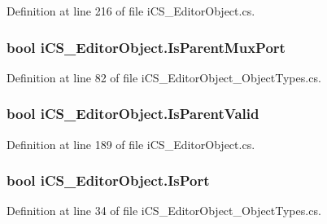 Definition at line 216 of file i\+C\+S\+\_\+\+Editor\+Object.\+cs.

\hypertarget{classi_c_s___editor_object_a9e197b013a5d84b3d804e6b41b49b457}{
\subsubsection[{Is\+Parent\+Mux\+Port}]{\setlength{\rightskip}{0pt plus 5cm}bool i\+C\+S\+\_\+\+Editor\+Object.\+Is\+Parent\+Mux\+Port\hspace{0.3cm}{\ttfamily [get]}}}\label{classi_c_s___editor_object_a9e197b013a5d84b3d804e6b41b49b457}


Definition at line 82 of file i\+C\+S\+\_\+\+Editor\+Object\+\_\+\+Object\+Types.\+cs.

\hypertarget{classi_c_s___editor_object_a586714b6e3231c809bdd500354d51fe4}{
\subsubsection[{Is\+Parent\+Valid}]{\setlength{\rightskip}{0pt plus 5cm}bool i\+C\+S\+\_\+\+Editor\+Object.\+Is\+Parent\+Valid\hspace{0.3cm}{\ttfamily [get]}}}\label{classi_c_s___editor_object_a586714b6e3231c809bdd500354d51fe4}


Definition at line 189 of file i\+C\+S\+\_\+\+Editor\+Object.\+cs.

\hypertarget{classi_c_s___editor_object_a26abbfc0d26a79daf3062af8bd16cd39}{
\subsubsection[{Is\+Port}]{\setlength{\rightskip}{0pt plus 5cm}bool i\+C\+S\+\_\+\+Editor\+Object.\+Is\+Port\hspace{0.3cm}{\ttfamily [get]}}}\label{classi_c_s___editor_object_a26abbfc0d26a79daf3062af8bd16cd39}


Definition at line 34 of file i\+C\+S\+\_\+\+Editor\+Object\+\_\+\+Object\+Types.\+cs.


